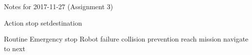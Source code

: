 
Notes for 2017-11-27 (Assignment 3)

Action
 stop
 setdestination
 
 Routine
  Emergency stop
  Robot failure
  collision prevention
  reach mission
  navigate to next
  
